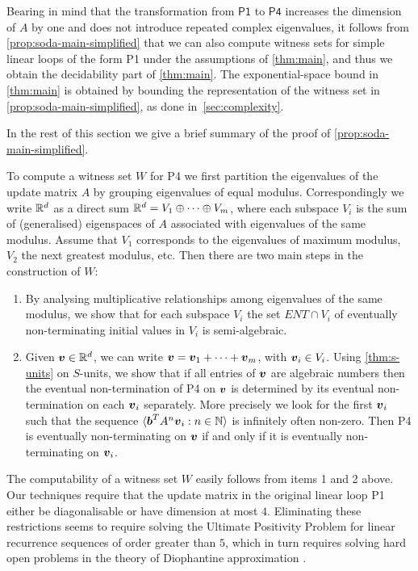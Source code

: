 Bearing in mind that the transformation from $\mathsf{P1}$ to
$\mathsf{P4}$ increases the dimension of $A$ by one and does not
introduce repeated complex eigenvalues, it follows from
\cref{prop:soda-main-simplified} that we can also compute witness sets for
simple linear loops of the form \textsf{P1}
under the assumptions of \cref{thm:main}, and thus we obtain
the decidability part of \cref{thm:main}.  The
exponential-space bound in \cref{thm:main} is obtained by
bounding the representation of the witness set in
\cref{prop:soda-main-simplified}, as done in~\cref{sec:complexity}.

In the rest of this section we give a brief summary of the proof of
\cref{prop:soda-main-simplified}.

To compute a witness set $W$ for \textsf{P4} we first partition the
eigenvalues of the update matrix $A$ by grouping eigenvalues of equal
modulus.  Correspondingly we write $\mathbb{R}^{d}$ as a direct sum
$\mathbb{R}^{d} = V_1 \oplus \cdots \oplus V_m$, where each subspace
$V_i$ is the sum of (generalised) eigenspaces of $A$ associated with
eigenvalues of the same modulus.  Assume that $V_1$ corresponds to the
eigenvalues of maximum modulus, $V_2$ the next greatest modulus,
etc.  Then there are two main steps in the construction of $W$:
\begin{enumerate}
\item
 By analysing multiplicative relationships among eigenvalues of the
 same modulus, we show that for each subspace $V_i$ the set
 $\mathit{ENT}\cap V_i$ of eventually non-terminating initial values
 in $V_i$ is semi-algebraic.
\item
Given $\boldsymbol{v} \in \mathbb{R}^{d}$, we can write
$\boldsymbol{v}=\boldsymbol{v}_1+\cdots+\boldsymbol{v}_m$, with
$\boldsymbol{v}_i \in V_i$.  Using \cref{thm:s-units} on
$S$-units, we show that if all entries of $\boldsymbol{v}$ are
algebraic numbers then the eventual non-termination of \textsf{P4} on
$\boldsymbol{v}$ is determined by its eventual non-termination on each
$\boldsymbol{v}_i$ separately.  More precisely we look for the first
$\boldsymbol{v}_i$ such that the sequence $\langle
\boldsymbol{b}^{T} A^{n}\boldsymbol{v}_i : n \in \mathbb{N}\rangle$ is infinitely often non-zero. Then \textsf{P4} is eventually non-terminating on
$\boldsymbol{v}$ if and only if it is eventually non-terminating on
$\boldsymbol{v}_i$.
\end{enumerate}

The computability of a witness set $W$ easily follows from items 1 and
2 above. Our techniques require that the update matrix in the
original linear loop \textsf{P1} either be diagonalisable or have
dimension at most $4$.  Eliminating these restrictions seems to
require solving the Ultimate Positivity Problem for linear recurrence
sequences of order greater than $5$, which in turn requires solving
hard open problems in the theory of Diophantine approximation
\cite{OW14:SODA}.
